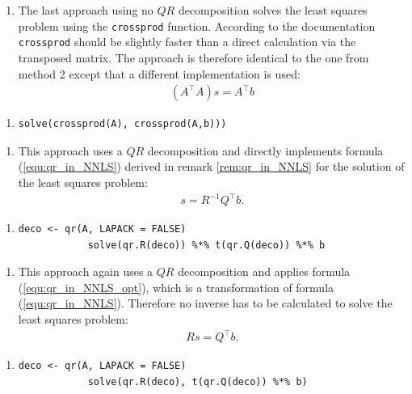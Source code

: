 \begin{enumerate}[resume*=quest]
	\item The last approach using no $QR$ decomposition solves the least squares problem using the \texttt{crossprod} function. According to the documentation \texttt{crossprod} should be slightly faster than a direct calculation via the transposed matrix. The approach is therefore identical to the one from method 2 except that a different implementation is used:
	\begin{align*}
		(A^\top A)s =  A^\top b
	\end{align*}
\end{enumerate}
\begin{enumerate}[resume*=inform]
	\item[] \begin{lstlisting}[otherkeywords={\%*\%, qr.R}, numbers=none]
	solve(crossprod(A), crossprod(A,b)))
	\end{lstlisting}
\end{enumerate}


\begin{enumerate}[resume*=quest]
	\item This approach uses a $QR$ decomposition and directly implements formula (\ref{equ:qr_in_NNLS}) derived in remark \ref{rem:qr_in_NNLS} for the solution of the least squares problem:
	\begin{align*}
		s = R^{-1} Q^\top b.
	\end{align*}
\end{enumerate}
\begin{enumerate}[resume*=inform]
	\item[] \begin{lstlisting}[otherkeywords={\%*\%, qr.R}, numbers=none]
			deco <- qr(A, LAPACK = FALSE)
			solve(qr.R(deco)) %*% t(qr.Q(deco)) %*% b
			\end{lstlisting}
\end{enumerate}


\begin{enumerate}[resume*=quest]
	\item This approach again uses a $QR$ decomposition and applies formula (\ref{equ:qr_in_NNLS_opt}), which is a transformation of formula (\ref{equ:qr_in_NNLS}). Therefore no inverse has to be calculated to solve the least squares problem:
	\begin{align*}
		Rs = Q^\top b.
	\end{align*}
\end{enumerate}
\begin{enumerate}[resume*=inform]
	\item[] \begin{lstlisting}[otherkeywords={\%*\%, qr.R}, numbers=none]
			deco <- qr(A, LAPACK = FALSE)
			solve(qr.R(deco), t(qr.Q(deco)) %*% b)
			\end{lstlisting}
\end{enumerate}


